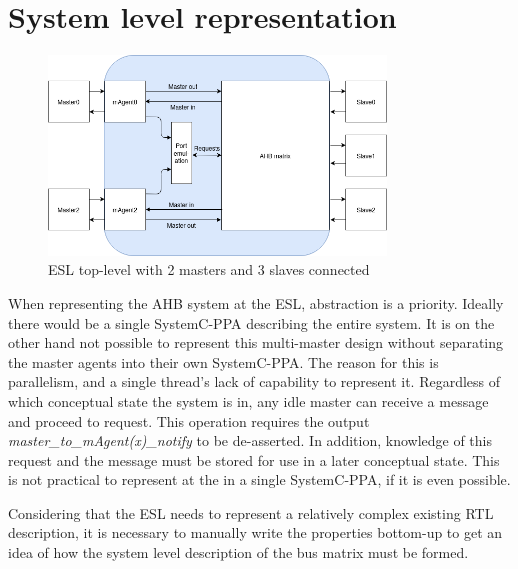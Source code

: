 \section{System level representation}
\label{sec:syslev}
\begin{figure}[hbt]
    \begin{center}
        \includegraphics[width=0.8\textwidth]{figs/ESL/Syslev.png}
    \end{center}
    \caption{ESL top-level with 2 masters and 3 slaves connected}
    \label{fig:esl_toplev}
\end{figure}

When representing the AHB system at the ESL, abstraction is a priority. Ideally there would be a single SystemC-PPA describing the entire system. It is on 
the other hand not possible to represent this multi-master design without separating the master agents into their own SystemC-PPA. The reason for this is 
parallelism, and a single thread's lack of capability to represent it. Regardless of which conceptual state the system is in, any idle master can receive 
a message and proceed to request. This operation requires the output \textit{master\_to\_mAgent(x)\_notify} to be de-asserted. In addition, knowledge of this request and the message must be stored for use in a later conceptual state. This is not practical to represent at the in a single SystemC-PPA, if it is even possible. \par
Considering that the ESL needs to represent a relatively complex existing RTL description, it is necessary to manually write the properties bottom-up to get an idea of how the system level description of the bus matrix must be formed.


